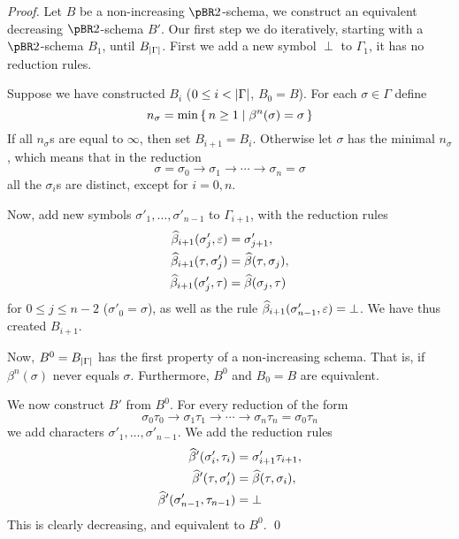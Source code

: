 \documentclass{llncs}
\begin{document}
\begin{proof}

    Let $B$ be a non-increasing $\pBR2$-schema, we construct an equivalent decreasing $\pBR2$-schema $B'$.
    Our first step we do iteratively, starting with a $\pBR2$-schema $B_1$, until $B_{\left|\Gamma\right|}$.
    First we add a new symbol $\perp$ to $\Gamma_1$, it has no reduction rules.

    Suppose we have constructed $B_i$ ($0\leq i<\left|\Gamma\right|$, $B_0=B$).
    For each $\sigma\in\Gamma$ define
    $$ n_\sigma = \min\set{n\geq1}[\beta^n(\sigma)=\sigma] $$
    If all $n_\sigma$s are equal to $\infty$, then set $B_{i+1}=B_i$.
    Otherwise let $\sigma$ has the minimal $n_\sigma$, which means that in the reduction
    $$ \sigma = \sigma_0 \to \sigma_1 \to \cdots \to \sigma_n = \sigma $$
    all the $\sigma_i$s are distinct, except for $i=0,n$.

    Now, add new symbols $\sigma'_1,\dots,\sigma'_{n-1}$ to $\Gamma_{i+1}$, with the reduction rules
    \begin{align*}
            \widehat\beta_{i+1}(\sigma'_j,\varepsilon)&=\sigma'_{j+1},\\
            \widehat\beta_{i+1}(\tau,\sigma'_j) &= \widehat\beta(\tau,\sigma_j),\\
            \widehat\beta_{i+1}(\sigma'_j,\tau) &= \widehat\beta(\sigma_j,\tau)
    \end{align*}
    for $0\leq j\leq n-2$ ($\sigma'_0=\sigma$), as well as the rule $\widehat\beta_{i+1}(\sigma'_{n-1},\varepsilon)=\bot$.
    We have thus created $B_{i+1}$.

    Now, $B^0=B_{\left|\Gamma\right|}$ has the first property of a non-increasing schema.
    That is, if $\beta^n(\sigma)$ never equals $\sigma$.
    Furthermore, $B^0$ and $B_0=B$ are equivalent.

    We now construct $B'$ from $B^0$.
    For every reduction of the form
    $$ \sigma_0\tau_0 \to \sigma_1\tau_1 \to \cdots \to \sigma_n\tau_n = \sigma_0\tau_n $$
    we add characters $\sigma'_1,\dots,\sigma'_{n-1}$.
    We add the reduction rules
    \begin{align*}
            \widehat\beta'(\sigma'_i,\tau_i) &= \sigma'_{i+1}\tau_{i+1},\\
            \widehat\beta'(\tau,\sigma'_i) &= \widehat\beta(\tau,\sigma_i),\\
            \widehat\beta'(\sigma'_{n-1},\tau_{n-1}) &= \bot
    \end{align*}
    This is clearly decreasing, and equivalent to $B^0$.
    \qed

\end{proof}
\end{document}
